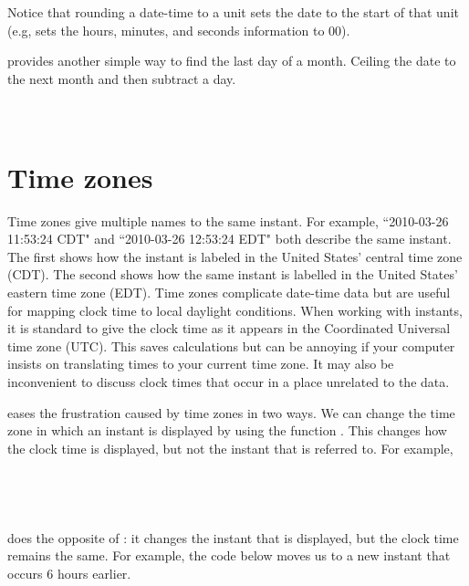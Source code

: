 \documentclass[article]{jss}
\begin{document}
Notice that rounding a date-time to a unit sets the date to the start of that unit (e.g,  sets the hours, minutes, and seconds information to 00).


 provides another simple way to find the last day of a month. Ceiling the date to the next month and then subtract a day.\\

\\
\\


\section{Time zones}
\label{sec:tz}

Time zones give multiple names to the same instant. For example, ``2010-03-26 11:53:24 CDT" and ``2010-03-26 12:53:24 EDT" both describe the same instant. The first shows how the instant is labeled in the United States' central time zone (CDT). The second shows how the same instant is labelled in the United States' eastern time zone (EDT). Time zones complicate date-time data but are useful for mapping clock time to local daylight conditions. When working with instants, it is standard to give the clock time as it appears in the Coordinated Universal time zone (UTC).  This saves calculations but can be annoying if your computer insists on translating times to your current time zone.  It may also be inconvenient to discuss clock times that occur in a place unrelated to the data.

 eases the frustration caused by time zones in two ways. We can change the time zone in which an instant is displayed by using the function . This changes how the clock time is displayed, but not the instant that is referred to. For example,\\

\\
\\
\\
\\

 does the opposite of : it changes the instant that is displayed, but the clock time remains the same. For example, the code below moves us to a new instant that occurs 6 hours earlier.\\
\end{document}
